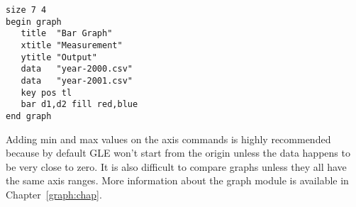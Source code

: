 \preglegraph{}
\begin{minipage}[c]{8cm}
\begin{Verbatim}
size 7 4
begin graph
   title  "Bar Graph"
   xtitle "Measurement"
   ytitle "Output"
   data   "year-2000.csv"
   data   "year-2001.csv"
   key pos tl
   bar d1,d2 fill red,blue
end graph
\end{Verbatim}
\end{minipage}
\hfill
\begin{minipage}[c]{7cm}
\mbox{}
\end{minipage}
\postglegraph{}

Adding min and max values on the axis commands is highly recommended because by default GLE won't start from the origin unless the data happens to be very close to zero. It is also difficult to compare graphs unless they all have the same axis ranges. More information about the graph module is available in Chapter~\ref{graph:chap}.

